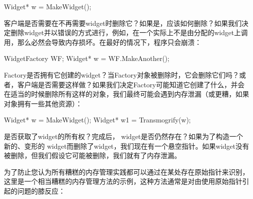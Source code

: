 \begin{code}
Widget* w = MakeWidget();
\end{code}

客户端是否需要在不再需要widget时删除它？如果是，应该如何删除？如果我们决定删除widget并以错误的方式进行，例如，在一个实际上不是由分配的widget上调用，那么必然会导致内存损坏。在最好的情况下，程序只会崩溃：

\begin{code}
WidgetFactory WF;
Widget* w = WF.MakeAnother();
\end{code}

Factory是否拥有它创建的widget？当Factory对象被删除时，它会删除它们吗？或者，客户端是否需要这样做？如果我们决定Factory可能知道它创建了什么，并会在适当的时候删除所有这样的对象，我们最终可能会遇到内存泄漏（或更糟，如果对象拥有一些其他资源）：

\begin{code}
Widget* w = MakeWidget();
Widget* w1 = Transmogrify(w);
\end{code}

是否获取了widget的所有权？完成后， widget是否仍然存在？如果为了构造一个新的、变形的 widget而删除了widget，我们现在有一个悬空指针。如果widget没有被删除，但我们假设它可能被删除，我们就有了内存泄漏。

为了防止您认为所有糟糕的内存管理实践都可以通过在某处存在原始指针来识别，这里是一个相当糟糕的内存管理方法的示例，这种方法通常是对由使用原始指针引起的问题的膝反应：

